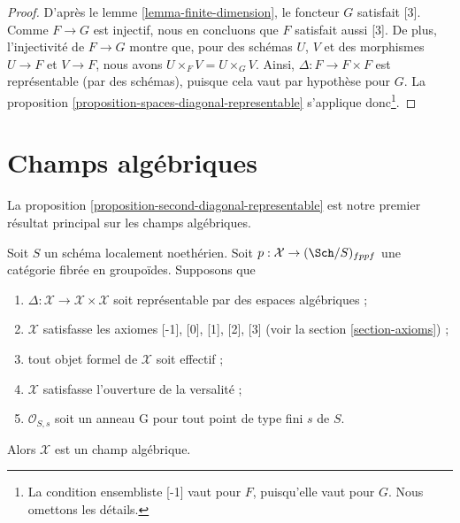 \begin{proof}
D'après le lemme \ref{lemma-finite-dimension}, le foncteur $G$ satisfait [3].
Comme $F \to G$ est injectif, nous en concluons que $F$ satisfait aussi [3].
De plus, l'injectivité de $F \to G$ montre que, pour des schémas $U$, $V$ et
des morphismes $U \to F$ et $V \to F$, nous avons
$U \times_F V = U \times_G V$. Ainsi, $\Delta : F \to F \times F$ est
représentable (par des schémas), puisque cela vaut par hypothèse pour $G$.
La proposition \ref{proposition-spaces-diagonal-representable} s'applique
donc\footnote{La condition ensembliste [-1] vaut pour $F$, puisqu'elle vaut
pour $G$. Nous omettons les détails.}.
\end{proof}












\section{Champs algébriques}
\label{section-algebraic-stacks}

\noindent
La proposition \ref{proposition-second-diagonal-representable} est notre
premier résultat principal sur les champs algébriques.

\begin{lemma}
\label{lemma-diagonal-representable}
Soit $S$ un schéma localement noethérien. Soit
$p : \mathcal{X} \to (\Sch/S)_{fppf}$ une catégorie fibrée en groupoïdes.
Supposons que
\begin{enumerate}
\item $\Delta : \mathcal{X} \to \mathcal{X} \times \mathcal{X}$
soit représentable par des espaces algébriques ;
\item $\mathcal{X}$ satisfasse les axiomes [-1], [0], [1], [2], [3] (voir la
section \ref{section-axioms}) ;
\item tout objet formel de $\mathcal{X}$ soit effectif ;
\item $\mathcal{X}$ satisfasse l'ouverture de la versalité ;
\item $\mathcal{O}_{S, s}$ soit un anneau G pour tout point de type fini $s$
de $S$.
\end{enumerate}
Alors $\mathcal{X}$ est un champ algébrique.
\end{lemma}

